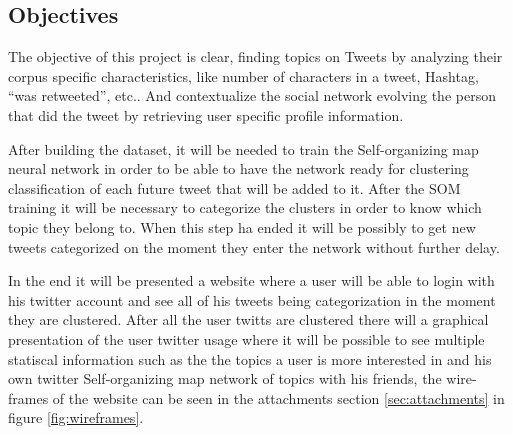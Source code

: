 \subsection{Objectives} %
\label{sub:objectives}

The objective of this project is clear, finding topics on Tweets by analyzing their corpus specific characteristics, like number of characters in a tweet, Hashtag, “was retweeted”, etc.. And contextualize the social network evolving the person that did the tweet by retrieving user specific profile information.

After building the dataset, it will be needed to train the Self-organizing map neural network in order to be able to have the network ready for clustering classification of each future tweet that will be added to it. After the SOM training it will be necessary to categorize the clusters in order to know which topic they belong to. When this step ha ended it will be possibly to get new tweets categorized on the moment they enter the network without further delay.

In the end it will be presented a website where a user will be able to login with his twitter account and see all of his tweets being categorization in the moment they are clustered. After all the user twitts are clustered there will a graphical presentation of the user twitter usage where it will be possible to see multiple statiscal information such as the the topics a user is more interested in and his own twitter Self-organizing map network of topics with his friends, the wire-frames of the website can be seen in the attachments section \ref{sec:attachments} in figure \ref{fig:wireframes}.

